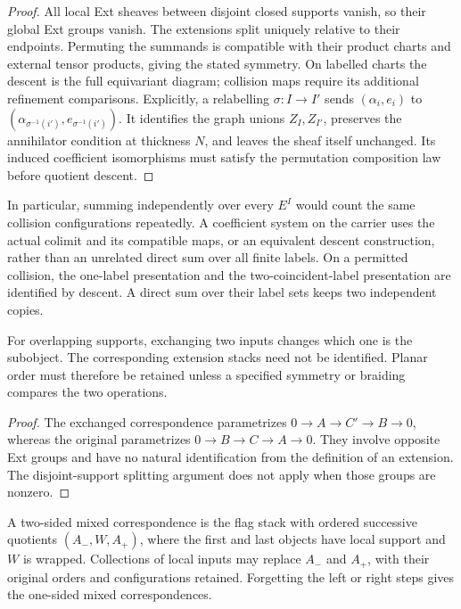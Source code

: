 \begin{proof}
All local Ext sheaves between disjoint closed supports vanish,
so their global Ext groups vanish. The extensions split uniquely
relative to their endpoints. Permuting the summands is compatible
with their product charts and external tensor products, giving
the stated symmetry. On labelled charts the descent is the full
equivariant diagram; collision maps require its additional
refinement comparisons.
Explicitly, a relabelling $\sigma:I\to I'$ sends
$(\alpha_i,e_i)$ to
$(\alpha_{\sigma^{-1}(i')},e_{\sigma^{-1}(i')})$.
It identifies the graph unions $Z_I,Z_{I'}$, preserves the
annihilator condition at thickness $N$, and leaves the sheaf
itself unchanged. Its induced coefficient isomorphisms must
satisfy the permutation composition law before quotient descent.
\end{proof}

In particular, summing independently over every $E^I$ would count
the same collision configurations repeatedly. A coefficient system
on the carrier uses the actual colimit and its compatible maps,
or an equivalent descent construction, rather than an unrelated
direct sum over all finite labels.
On a permitted collision, the one-label presentation and the
two-coincident-label presentation are identified by descent.
A direct sum over their label sets keeps two independent copies.

\begin{proposition}
\label{prop:wrapped-insertion-order-conventions}
For overlapping supports, exchanging two inputs changes which
one is the subobject. The corresponding extension stacks need
not be identified. Planar order must therefore be retained unless
a specified symmetry or braiding compares the two operations.
\end{proposition}

\begin{proof}
The exchanged correspondence parametrizes
$0\to A\to C'\to B\to0$, whereas the original parametrizes
$0\to B\to C\to A\to0$. They involve opposite Ext groups and
have no natural identification from the definition of an
extension. The disjoint-support splitting argument does not
apply when those groups are nonzero.
\end{proof}

\begin{definition}
\label{def:two-sided-mixed-correspondence-datum}
A two-sided mixed correspondence is the flag stack with ordered
successive quotients $(A_-,W,A_+)$, where the first and last
objects have local support and $W$ is wrapped. Collections of
local inputs may replace $A_-$ and $A_+$, with their original
orders and configurations retained. Forgetting the left or right
steps gives the one-sided mixed correspondences.
\end{definition}


